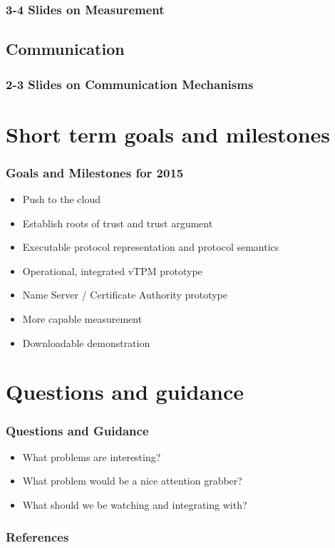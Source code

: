 \documentclass{beamer}
\begin{document}
\begin{frame}
  \frametitle{3-4 Slides on Measurement}
\end{frame}

\subsection{Communication}

\begin{frame}
  \frametitle{2-3 Slides on Communication Mechanisms}
\end{frame}

\section{Short term goals and milestones}

\begin{frame}
  \frametitle{Goals and Milestones for 2015}

  \begin{itemize}
  \item Push to the cloud
  \item Establish roots of trust and trust argument
  \item Executable protocol representation and protocol semantics
  \item Operational, integrated vTPM prototype
  \item Name Server / Certificate Authority prototype
  \item More capable measurement
  \item Downloadable demonstration
  \end{itemize}
\end{frame}

\section{Questions and guidance}

\begin{frame}
  \frametitle{Questions and Guidance}

  \begin{itemize}
  \item What problems are interesting?
  \item What problem would be a nice attention grabber?
  \item What should we be watching and integrating with?
  \end{itemize}
\end{frame}

\nocite{Coker::Principles-of-R,Haldar:04:Semantic-Remote,Fabrega:1999aa}

\begin{frame}
  \frametitle{References}
  
\end{frame}
\end{document}
